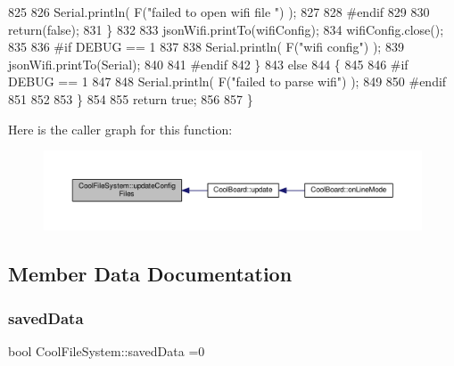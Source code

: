 \begin{DoxyCode}
825 
826             Serial.println( F(\textcolor{stringliteral}{"failed to open wifi file "}) );
827         
828 \textcolor{preprocessor}{        #endif}
829         
830             \textcolor{keywordflow}{return}(\textcolor{keyword}{false});
831         \}
832 
833         jsonWifi.printTo(wifiConfig);
834         wifiConfig.close();
835 
836 \textcolor{preprocessor}{#if DEBUG == 1 }
837 
838         Serial.println( F(\textcolor{stringliteral}{"wifi config"}) );
839         jsonWifi.printTo(Serial);
840 
841 \textcolor{preprocessor}{#endif}
842     \}
843     \textcolor{keywordflow}{else}
844     \{
845 
846 \textcolor{preprocessor}{    #if DEBUG == 1 }
847 
848         Serial.println( F(\textcolor{stringliteral}{"failed to parse wifi"}) );
849     
850 \textcolor{preprocessor}{    #endif}
851 
852     
853     \}   
854         
855     \textcolor{keywordflow}{return} \textcolor{keyword}{true};
856 
857 \}   
\end{DoxyCode}
Here is the caller graph for this function\+:\nopagebreak
\begin{figure}[H]
\begin{center}
\leavevmode
\includegraphics[width=350pt]{classCoolFileSystem_a32dad79ae80182a83e2e8f52286b7c7b_icgraph}
\end{center}
\end{figure}


\subsection{Member Data Documentation}
\mbox{\label{classCoolFileSystem_ad398e0c5c41a0c88acdf5d672aa71351}} 
\subsubsection{\texorpdfstring{saved\+Data}{savedData}}
{\footnotesize\ttfamily bool Cool\+File\+System\+::saved\+Data =0\hspace{0.3cm}{\ttfamily [private]}}



